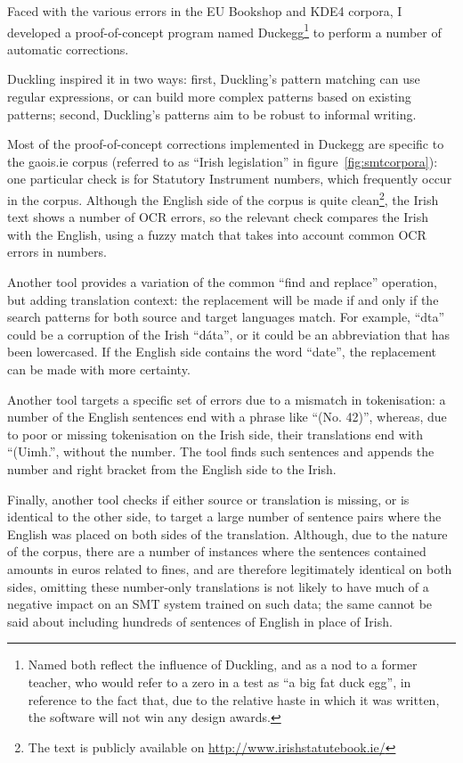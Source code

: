 Faced with the various errors in the EU Bookshop and KDE4 corpora, I developed a proof-of-concept program
named Duckegg\footnote{Named both reflect the influence of Duckling, and as a nod to a former teacher, who
would refer to a zero in a test as ``a big fat duck egg'', in reference to the fact that, due to the relative 
haste in which it was written, the software will not win any design awards.} to perform a number of automatic
corrections.

Duckling inspired it in two ways: first, Duckling's pattern matching can use regular expressions, or can build
more complex patterns based on existing patterns; second, Duckling's patterns aim to be robust to informal writing.

Most of the proof-of-concept corrections implemented in Duckegg are specific to the gaois.ie corpus (referred
to as ``Irish legislation'' in figure~\ref{fig:smtcorpora}): one particular check is for Statutory Instrument
numbers, which frequently occur in the corpus. Although the English side of the corpus is quite clean\footnote{The
text is publicly available on \href{http://www.irishstatutebook.ie/}{http://www.irishstatutebook.ie/}}, the
Irish text shows a number of OCR errors, so the relevant check compares the Irish with the English, using
a fuzzy match that takes into account common OCR errors in numbers.

Another tool provides a variation of the common ``find and replace'' operation, but adding translation context:
the replacement will be made if and only if the search patterns for both source and target languages match.
For example, ``dta'' could be a corruption of the Irish ``d\'ata'', or it could be an abbreviation that has been
lowercased. If the English side contains the word ``date'', the replacement can be made with more certainty.

Another tool targets a specific set of errors due to a mismatch in tokenisation: a number of the English sentences
end with a phrase like ``(No. 42)'', whereas, due to poor or missing tokenisation on the Irish side, their 
translations end with ``(Uimh.'', without the number. The tool finds such sentences and appends the number and
right bracket from the English side to the Irish.

Finally, another tool checks if either source or translation is missing, or is identical to the other side, to target
a large number of sentence pairs where the English was placed on both sides of the translation. Although, due to
the nature of the corpus, there are a number of instances where the sentences contained amounts in euros related to fines, and are therefore
legitimately identical on both sides, omitting these number-only translations is not likely to have much of a negative
impact on an SMT system trained on such data; the same cannot be said about including hundreds of sentences of English
in place of Irish.


